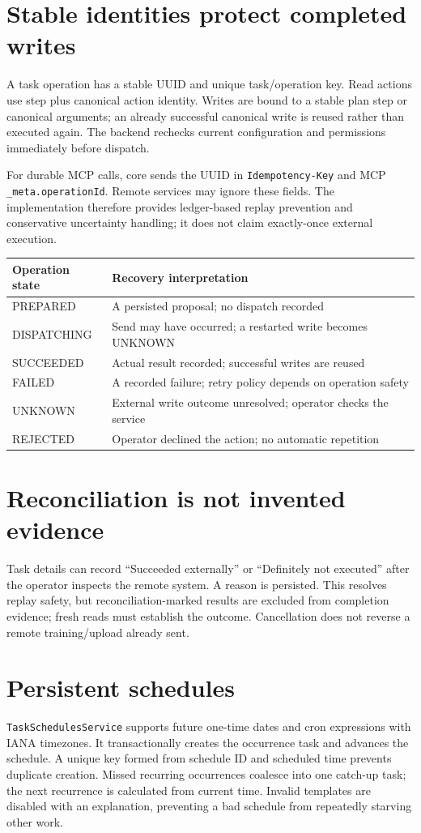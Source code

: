 \section*{Stable identities protect completed writes}
A task operation has a stable UUID and unique task/operation key. Read actions use step plus canonical action identity. Writes are bound to a stable plan step or canonical arguments; an already successful canonical write is reused rather than executed again. The backend rechecks current configuration and permissions immediately before dispatch.

For durable MCP calls, core sends the UUID in \texttt{Idempotency-Key} and MCP \texttt{\_meta.operationId}. Remote services may ignore these fields. The implementation therefore provides ledger-based replay prevention and conservative uncertainty handling; it does not claim exactly-once external execution.
\begin{tabularx}{\linewidth}{@{}lX@{}}\toprule
Operation state & Recovery interpretation\\\midrule
PREPARED & A persisted proposal; no dispatch recorded\\
DISPATCHING & Send may have occurred; a restarted write becomes UNKNOWN\\
SUCCEEDED & Actual result recorded; successful writes are reused\\
FAILED & A recorded failure; retry policy depends on operation safety\\
UNKNOWN & External write outcome unresolved; operator checks the service\\
REJECTED & Operator declined the action; no automatic repetition\\\bottomrule
\end{tabularx}
\section*{Reconciliation is not invented evidence}
Task details can record ``Succeeded externally'' or ``Definitely not executed'' after the operator inspects the remote system. A reason is persisted. This resolves replay safety, but reconciliation-marked results are excluded from completion evidence; fresh reads must establish the outcome. Cancellation does not reverse a remote training/upload already sent.
\section*{Persistent schedules}
\texttt{TaskSchedulesService} supports future one-time dates and cron expressions with IANA timezones. It transactionally creates the occurrence task and advances the schedule. A unique key formed from schedule ID and scheduled time prevents duplicate creation. Missed recurring occurrences coalesce into one catch-up task; the next recurrence is calculated from current time. Invalid templates are disabled with an explanation, preventing a bad schedule from repeatedly starving other work.

